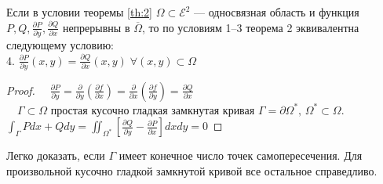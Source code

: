 \begin{theorem}\label{th:3} Если в условии теоремы \ref{th:2} $\Omega\subset\mathscr{E}^2$ --- односвязная область и функция $P,Q,\frac{\partial P}{\partial y},\frac{\partial Q}{\partial x}$ непрерывны в $\overline{\Omega}$, то по условиям 1--3 теорема 2 эквивалентна следующему условию:\\
4. $\frac{\partial P}{\partial y}(x,y)=\frac{\partial Q}{\partial x}(x,y)\;\forall(x,y)\subset\Omega$
\end{theorem}
\begin{proof}
 $\quad\frac{\partial P}{\partial y}=\frac{\partial}{\partial y}\left(\frac{\partial f}{\partial x}\right)=\frac{\partial}{\partial x}\left(\frac{\partial f}{\partial y}\right)=\frac{\partial Q}{\partial x}$\\
$\quad \varGamma\subset\Omega$ простая кусочно гладкая замкнутая кривая $\varGamma=\partial \Omega^*,\,\Omega^*\subset\Omega$.\\
$\int_{\varGamma}Pdx+Qdy=\iint_{\Omega^*}\left[\frac{\partial Q}{\partial y}-\frac{\partial P}{\partial x}\right]dxdy=0$
\end{proof} 
Легко доказать, если $\varGamma$ имеет конечное число точек самопересечения. Для произвольной кусочно гладкой замкнутой кривой все остальное справедливо.